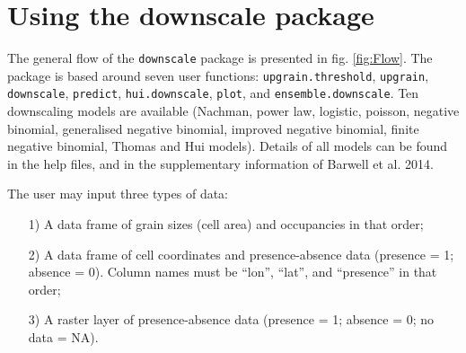 \documentclass{article}[12pt, a4paper]
\begin{document}
\newpage
\section{Using the downscale package}

The general flow of the \texttt{downscale} package is presented in fig. \ref{fig:Flow}. The package is based around seven user functions:  \texttt{upgrain.threshold}, \texttt{upgrain}, \texttt{downscale}, \texttt{predict}, \texttt{hui.downscale}, \texttt{plot}, and \texttt{ensemble.downscale}. Ten downscaling models are available (Nachman, power law, logistic, poisson, negative binomial, generalised negative binomial, improved negative binomial, finite negative binomial, Thomas and Hui models). Details of all models can be found in the help files, and in the supplementary information of Barwell et al. 2014. 

The user may input three types of data:
\begin{enumerate} \itemsep1pt \parskip0pt 
\item [1)] A data frame of grain sizes (cell area) and occupancies in that order;
\item [2)] A data frame of cell coordinates and presence-absence data (presence = 1; absence = 0). Column names must be “lon”, “lat”, and “presence” in that order;
\item [3)] A raster layer of presence-absence data (presence = 1; absence = 0; no data = NA).
\end{enumerate}
\end{document}
